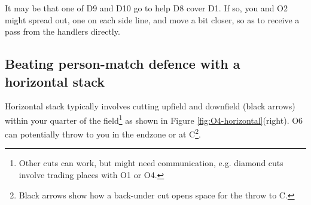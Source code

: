 \documentclass{tufte-handout}
\begin{document}
It may be that 
one of 
D9 
and D10 
go to help D8 
cover D1.  
If so, 
you and O2 
might spread out, 
one on each side line,
and move a bit closer, 
so as to receive a pass from 
the handlers directly.  


\subsection{Beating person-match defence with a horizontal stack}\label{sec:horizontall}
Horizontal stack 
typically involves cutting
upfield and downfield (black arrows)
within your quarter of the field\footnote{
Other cuts
can work, 
but might need
communication,
e.g. diamond cuts 
involve trading places 
with O1 
or O4.}
as shown in 
Figure \ref{fig:O4-horizontal}(right).
O6 
can potentially 
throw to you 
in the endzone 
or at C\footnote{
Black arrows
show how a back-under cut 
opens space 
for the throw 
to C.}. 
\end{document}
